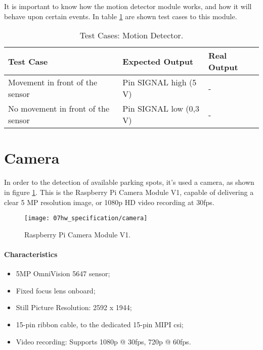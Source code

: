 It is important to know how the motion detector module works, and how it will behave upon certain events. In table \ref{table:test_pir} are shown test cases to this module.

\begin{table}[H]
	\centering
	\resizebox{\columnwidth}{!}
	{
		\begin{tabular}{|m{3cm}|m{5cm}||m{5cm}|}
			\hline
			\textbf{Test Case} & \textbf{Expected Output} & \textbf{Real Output}
			\\\hline\hline
			Movement in front of the sensor & Pin SIGNAL high (5 V) & -
			\\\hline
			No movement in front of the sensor & Pin SIGNAL low (0,3 V) & -
			\\\hline
		\end{tabular}
	}
	\caption{Test Cases: Motion Detector.}
	\label{table:test_pir}
\end{table}

\clearpage
\section{Camera}
In order to the detection of available parking spots, it's used a camera, as shown in figure \ref{fig:camera}. This is the Raspberry Pi Camera Module V1, capable of delivering a clear 5 MP resolution image, or 1080p HD video recording at 30fps. \cite{camera}

\begin{figure}[H]
	\centering
	\texttt{[image: 07hw\_specification/camera]}
	\caption{Raspberry Pi Camera Module V1.}
	\label{fig:camera}
\end{figure}

\paragraph*{Characteristics}
\begin{itemize}
	\item 5MP OmniVision 5647 sensor;
	\item Fixed focus lens onboard;
	\item Still Picture Resolution: 2592 x 1944;
	\item 15-pin ribbon cable, to the dedicated 15-pin MIPI \ac{csi};
	\item Video recording: Supports 1080p @ 30fps, 720p @ 60fps.
\end{itemize}

